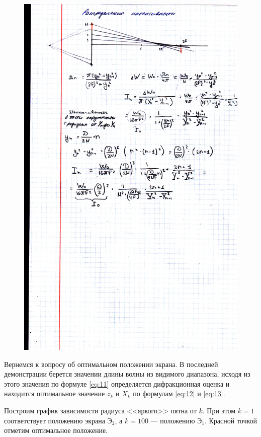 \documentclass[a4paper, 12pt]{article}
\begin{document}
\begin{figure}[H]
\begin{floatrow}
        {
        \includegraphics[width=0.8\linewidth]{9}
    }
    \end{floatrow}
\end{figure}




Вернемся к вопросу об оптимальном положении экрана. В последней
демонстрации берется значении длины волны из видимого диапазона,
исходя из этого значения по формуле \eqref{eq:11} определяется
дифракционная оценка и находится оптимальное значение $z_k$ и $X_k$ по
формулам \eqref{eq:12} и \eqref{eq:13}.

Построим график зависимости радиуса <<яркого>> пятна от $k$. При этом
$k=1$ соответствует положению экрана $\text{Э}_2$, а $k=100$ ---
положению $\text{Э}_1$. Красной точкой отметим оптимальное положение.
\end{document}
